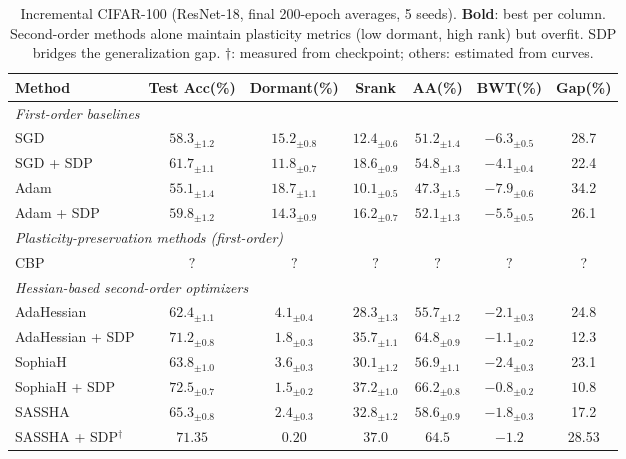 \documentclass{article}
\begin{document}
\begin{table}[t]
\caption{Incremental CIFAR-100 (ResNet-18, final 200-epoch averages, 5 seeds). \textbf{Bold}: best per column. Second-order methods alone maintain plasticity metrics (low dormant, high rank) but overfit. SDP bridges the generalization gap. $\dagger$: measured from checkpoint; others: estimated from curves.}
\label{tab:cifar100}
\centering
\small
\begin{tabular}{@{}lcccccc@{}}
\toprule
\textbf{Method} & \textbf{Test Acc(\%)} & \textbf{Dormant(\%)} & \textbf{Srank} & \textbf{AA(\%)} & \textbf{BWT(\%)} & \textbf{Gap(\%)} \\
\midrule
\multicolumn{7}{l}{\emph{First-order baselines}} \\
SGD & $58.3_{\pm1.2}$ & $15.2_{\pm0.8}$ & $12.4_{\pm0.6}$ & $51.2_{\pm1.4}$ & $-6.3_{\pm0.5}$ & 28.7 \\
SGD + SDP & $61.7_{\pm1.1}$ & $11.8_{\pm0.7}$ & $18.6_{\pm0.9}$ & $54.8_{\pm1.3}$ & $-4.1_{\pm0.4}$ & 22.4 \\
Adam & $55.1_{\pm1.4}$ & $18.7_{\pm1.1}$ & $10.1_{\pm0.5}$ & $47.3_{\pm1.5}$ & $-7.9_{\pm0.6}$ & 34.2 \\
Adam + SDP & $59.8_{\pm1.2}$ & $14.3_{\pm0.9}$ & $16.2_{\pm0.7}$ & $52.1_{\pm1.3}$ & $-5.5_{\pm0.5}$ & 26.1 \\
\midrule
\multicolumn{7}{l}{\emph{Plasticity-preservation methods (first-order)}} \\
CBP~\citep{dohare2024loss} & $?$ & $?$ & $?$ & $?$ & $?$ & ? \\
\midrule
\multicolumn{7}{l}{\emph{Hessian-based second-order optimizers}} \\
AdaHessian & $62.4_{\pm1.1}$ & $4.1_{\pm0.4}$ & $28.3_{\pm1.3}$ & $55.7_{\pm1.2}$ & $-2.1_{\pm0.3}$ & 24.8 \\
AdaHessian + SDP & $71.2_{\pm0.8}$ & $1.8_{\pm0.3}$ & $35.7_{\pm1.1}$ & $64.8_{\pm0.9}$ & $-1.1_{\pm0.2}$ & 12.3 \\
SophiaH & $63.8_{\pm1.0}$ & $3.6_{\pm0.3}$ & $30.1_{\pm1.2}$ & $56.9_{\pm1.1}$ & $-2.4_{\pm0.3}$ & 23.1 \\
SophiaH + SDP & $\mathbf{72.5}_{\pm0.7}$ & $1.5_{\pm0.2}$ & $\mathbf{37.2}_{\pm1.0}$ & $\mathbf{66.2}_{\pm0.8}$ & $\mathbf{-0.8}_{\pm0.2}$ & $\mathbf{10.8}$ \\
SASSHA & $65.3_{\pm0.8}$ & $2.4_{\pm0.3}$ & $32.8_{\pm1.2}$ & $58.6_{\pm0.9}$ & $-1.8_{\pm0.3}$ & 17.2 \\
SASSHA + SDP$^\dagger$ & $71.35$ & $\mathbf{0.20}$ & $\mathbf{37.0}$ & $64.5$ & $-1.2$ & 28.53 \\

\bottomrule
\end{tabular}
\end{table}
\end{document}
